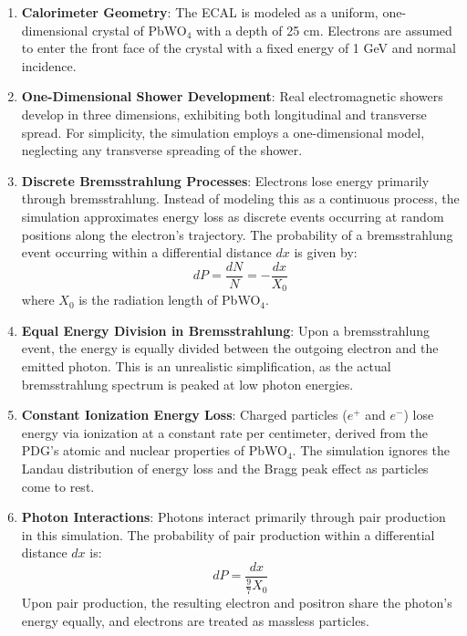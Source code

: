 \documentclass[twocolumn]{aastex631}
\begin{document}
\begin{enumerate}
    \item \textbf{Calorimeter Geometry}: The ECAL is modeled as a uniform, one-dimensional crystal of PbWO\(_4\) with a depth of 25 cm. Electrons are assumed to enter the front face of the crystal with a fixed energy of 1 GeV and normal incidence.
    
    \item \textbf{One-Dimensional Shower Development}: Real electromagnetic showers develop in three dimensions, exhibiting both longitudinal and transverse spread. For simplicity, the simulation employs a one-dimensional model, neglecting any transverse spreading of the shower.
    
    \item \textbf{Discrete Bremsstrahlung Processes}: Electrons lose energy primarily through bremsstrahlung. Instead of modeling this as a continuous process, the simulation approximates energy loss as discrete events occurring at random positions along the electron's trajectory. The probability of a bremsstrahlung event occurring within a differential distance \(dx\) is given by:
    \[
    dP = \frac{dN}{N} = - \frac{dx}{X_0}
    \]
    where \(X_0\) is the radiation length of PbWO\(_4\).
    
    \item \textbf{Equal Energy Division in Bremsstrahlung}: Upon a bremsstrahlung event, the energy is equally divided between the outgoing electron and the emitted photon. This is an unrealistic simplification, as the actual bremsstrahlung spectrum is peaked at low photon energies.
    
    \item \textbf{Constant Ionization Energy Loss}: Charged particles (\(e^+\) and \(e^-\)) lose energy via ionization at a constant rate per centimeter, derived from the PDG's atomic and nuclear properties of PbWO\(_4\). The simulation ignores the Landau distribution of energy loss and the Bragg peak effect as particles come to rest.
    
    \item \textbf{Photon Interactions}: Photons interact primarily through pair production in this simulation. The probability of pair production within a differential distance \(dx\) is:
    \[
    dP = \frac{dx}{\frac{9}{7} X_0}
    \]
    Upon pair production, the resulting electron and positron share the photon's energy equally, and electrons are treated as massless particles.
\end{enumerate}
\end{document}
